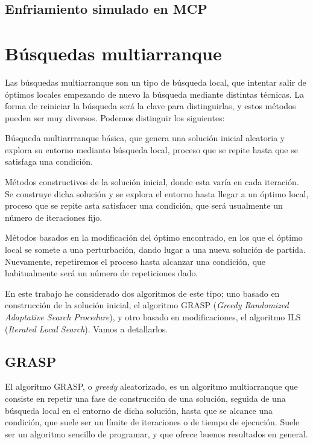 \subsection{Enfriamiento simulado en MCP}


\section{Búsquedas multiarranque}

Las búsquedas multiarranque son un tipo de búsqueda local, que intentar salir de óptimos locales
empezando de nuevo la búsqueda mediante distintas técnicas. La forma de reiniciar la búsqueda será
la clave para distinguirlas, y estos métodos pueden ser muy diversos. Podemos distinguir los siguientes:

Búsqueda multiarrranque básica, que genera una solución inicial aleatoria y explora su entorno
medianto búsqueda local, proceso que se repite hasta que se satisfaga una condición.

Métodos constructivos de la solución inicial, donde esta varía en cada iteración. Se construye dicha
solución y se explora el entorno hasta llegar a un óptimo local, proceso que se repite asta
satisfacer una condición, que será usualmente un número de iteraciones fijo.

Métodos basados en la modificación del óptimo encontrado, en los que el óptimo local se somete
a una perturbación, dando lugar a una nueva solución de partida. Nuevamente, repetiremos el
proceso hasta alcanzar una condición, que habitualmente será un número de repeticiones dado.

En este trabajo he considerado dos algoritmos de este tipo; uno basado en construcción de la solución
inicial, el algoritmo GRASP (\textit{Greedy Randomized Adaptative Search Procedure}), y otro basado
en modificaciones, el algoritmo ILS (\textit{Iterated Local Search}). Vamos a detallarlos.

\subsection{GRASP}

El algoritmo GRASP, o \textit{greedy} aleatorizado, es un algoritmo multiarranque que consiste en repetir
una fase de construcción de una solución, seguida de una búsqueda local en el entorno de dicha solución,
hasta que se alcance una condición, que suele ser un límite de iteraciones o de tiempo de ejecución.
Suele ser un algoritmo sencillo de programar, y que ofrece buenos resultados en general.

